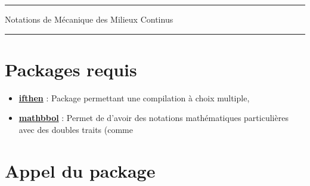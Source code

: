 \documentclass[a4paper,10pt]{article}
\begin{document}
	\begin{center}
		\hrule{\Large Notations de Mécanique des Milieux Continus}\\\hrule
	\end{center}


	\section{Packages requis}

	\begin{itemize}
		\item \href{http://www.ctan.org/pkg/ifthen}{\textbf{ifthen}} : Package permettant une compilation à choix multiple,
		\item \href{http://www.ctan.org/pkg/mathbbol}{\textbf{mathbbol}} : Permet de d'avoir des notations mathématiques particulières avec des doubles traits (comme %
	\end{itemize}

	\section{Appel du package}
\end{document}
